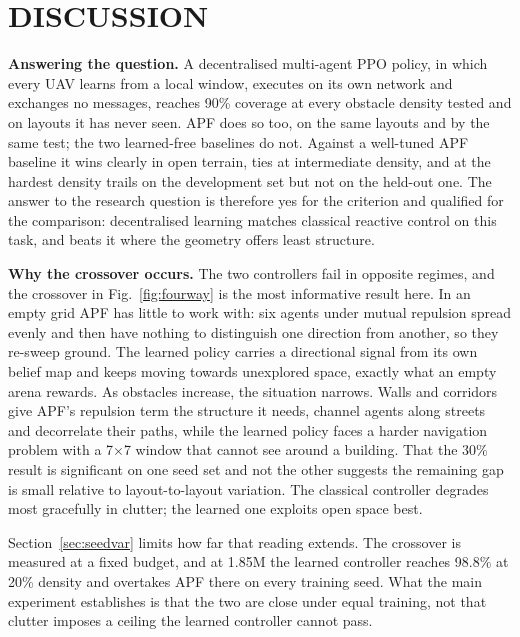 \documentclass[a4paper, 10pt, conference]{ieeeconf}
\begin{document}
\section{DISCUSSION}\label{sec:discussion}

\textbf{Answering the question.} A decentralised multi-agent PPO
policy, in which every UAV learns from a local window, executes on its
own network and exchanges no messages, reaches 90\% coverage at every
obstacle density tested and on layouts it has never seen. APF does so
too, on the same layouts and by the same test; the two learned-free
baselines do not. Against a well-tuned APF baseline it wins clearly in
open terrain, ties at intermediate density, and at the hardest density
trails on the development set but not on the held-out one. The answer
to the research question is therefore yes for the criterion and
qualified for the comparison: decentralised learning matches classical
reactive control on this task, and beats it where the geometry offers
least structure.

\textbf{Why the crossover occurs.} The two controllers fail in
opposite regimes, and the crossover in Fig.~\ref{fig:fourway} is the
most informative result here. In an empty grid APF has little to work
with: six agents under mutual repulsion spread evenly and then have
nothing to distinguish one direction from another, so they re-sweep
ground. The learned policy carries a directional signal from its own
belief map and keeps moving towards unexplored space, exactly what an
empty arena rewards. As obstacles increase, the situation narrows.
Walls and corridors give APF's repulsion term the structure it needs,
channel agents along streets and decorrelate their paths, while the
learned policy faces a harder navigation problem with a 7$\times$7
window that cannot see around a building. That the 30\% result is
significant on one seed set and not the other suggests the remaining
gap is small relative to layout-to-layout variation. The classical
controller degrades most gracefully in clutter; the learned one
exploits open space best.

Section~\ref{sec:seedvar} limits how far that reading extends. The
crossover is measured at a fixed budget, and at 1.85M the learned
controller reaches 98.8\% at 20\% density and overtakes APF there on
every training seed. What the main experiment establishes is that the
two are close under equal training, not that clutter imposes a ceiling
the learned controller cannot pass.
\end{document}
